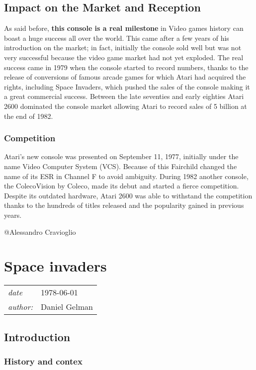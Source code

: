 \documentclass[a4paper,10pt]{book}
\newcommand{\pageHeader}[4]{
    \section{#1}
    \vspace{-0.3cm}
    \begin{table}[h!]
     \begin{tabular}{ll}
        \hline
        \textit{date} & #2 \\
        \textit{author: } & #3\\
        \hline
     \end{tabular}
    \end{table}
    \vspace{-0.3cm}
}
\begin{document}
 \subsection{Impact on the Market and Reception }
 
            As said before,  \textbf{this console is a real milestone }  in Video games history can boast a huge success all over the world.
            This came after a few years of his introduction on the market; in fact, initially the console sold well but was
            not very successful because the video game market had not yet exploded. The real success came in 1979 when the console
            started to record numbers, thanks to the release of conversions of famous arcade games for which Atari had acquired
            the rights, including Space Invaders, which pushed the sales of the console
            making it a great commercial success. Between the late seventies and early eighties Atari 2600 dominated the console market allowing Atari
            to record sales of 5 billion at the end of 1982.
         
 \subsubsection{Competition }
 
            Atari's new console was presented on September 11, 1977, initially under the name Video Computer System (VCS).
            Because of this Fairchild changed the name of its ESR in  Channel F  to avoid ambiguity.
            During 1982 another console, the ColecoVision by Coleco, made its debut and started a fierce competition. Despite its outdated hardware,
            Atari 2600 was able to withstand the competition thanks to the hundreds of titles released and the popularity gained in previous years.
         
 
 @Alessandro Cravioglio 
 
 \newpage\pageHeader{Space invaders}{1978-06-01}{Daniel Gelman}{Space invaders is a 1978 arcade game, this game at the time just created a coin deficit! You can try it here for free}
 \subsection{Introduction }
 \subsubsection{History and contex }
   \textbf{}   \textit{}
 
\end{document}
